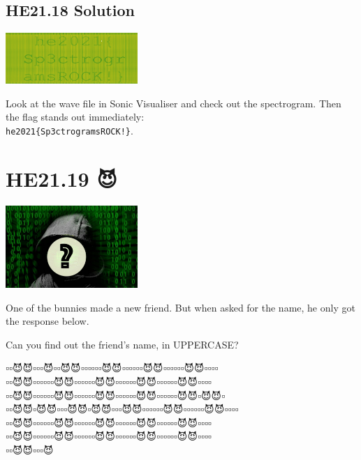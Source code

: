 \documentclass[english,a4paper,nols,noindent]{tufte-handout}
\begin{document}
\hypertarget{he21.18-solution}{%
\subsection{HE21.18 Solution}\label{he21.18-solution}}

\begin{marginfigure}
    \includegraphics[width=50mm]{ch18/spectrogram.png}
\end{marginfigure}

\noindent Look at the wave file in Sonic Visualiser and check out the
spectrogram.  Then the flag stands out immediately:\\
\noindent\verb+he2021{Sp3ctrogramsROCK!}+.


\hypertarget{he21.19}{%
  \section{HE21.19 😈}
  \label{he21.19}}
\begin{marginfigure}
    \includegraphics[width=50mm]{images/challenge19.jpg}
\end{marginfigure}

\noindent One of the bunnies made a new friend. But when asked for the name, he only got the response below.

Can you find out the friend's name, in UPPERCASE?

{\NotoEmoji
▫️▫️😈😈▫️▫️▫️😈▫️▫️😈😈▫️▫️▫️▫️▫️▫️😈😈▫️▫️▫️▫️▫️▫️😈😈▫️▫️▫️▫️▫️▫️😈😈▫️▫️▫️▫️\\
▫️▫️😈😈▫️▫️▫️▫️▫️▫️😈😈▫️▫️▫️▫️▫️▫️😈😈▫️▫️▫️▫️▫️▫️😈😈▫️▫️▫️▫️▫️▫️😈😈▫️▫️▫️▫️\\
▫️▫️😈😈▫️▫️▫️▫️▫️▫️😈😈▫️▫️▫️▫️▫️▫️😈😈▫️▫️▫️▫️▫️▫️😈😈▫️▫️▫️▫️▫️▫️😈😈▫️😈😈▫️\\
▫️▫️😈😈▫️😈😈▫️▫️▫️😈😈▫️😈😈▫️▫️▫️😈😈▫️▫️▫️▫️▫️▫️😈😈▫️▫️▫️▫️▫️▫️😈😈▫️▫️▫️▫️\\
▫️▫️😈😈▫️▫️▫️▫️▫️▫️😈😈▫️▫️▫️▫️▫️▫️😈😈▫️▫️▫️▫️▫️▫️😈😈▫️▫️▫️▫️▫️▫️😈😈▫️▫️▫️▫️\\
▫️▫️😈😈▫️▫️▫️▫️▫️▫️😈😈▫️▫️▫️▫️▫️▫️😈😈▫️▫️▫️▫️▫️▫️😈😈▫️▫️▫️▫️▫️▫️😈😈▫️▫️▫️▫️\\
▫️▫️😈😈▫️▫️▫️😈 }
\end{document}
